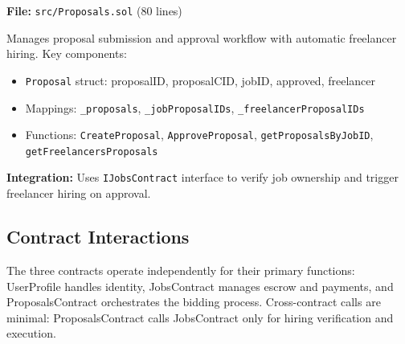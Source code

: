 \textbf{File:} \texttt{src/Proposals.sol} (80 lines)

Manages proposal submission and approval workflow with automatic freelancer hiring. Key components:
\begin{itemize}
    \item \texttt{Proposal} struct: proposalID, proposalCID, jobID, approved, freelancer
    \item Mappings: \texttt{\_proposals}, \texttt{\_jobProposalIDs}, \texttt{\_freelancerProposalIDs}
    \item Functions: \texttt{CreateProposal}, \texttt{ApproveProposal}, \texttt{getProposalsByJobID}, \texttt{getFreelancersProposals}
\end{itemize}

\textbf{Integration:} Uses \texttt{IJobsContract} interface to verify job ownership and trigger freelancer hiring on approval.

\subsection{Contract Interactions}

The three contracts operate independently for their primary functions: UserProfile handles identity, JobsContract manages escrow and payments, and ProposalsContract orchestrates the bidding process. Cross-contract calls are minimal: ProposalsContract calls JobsContract only for hiring verification and execution.
